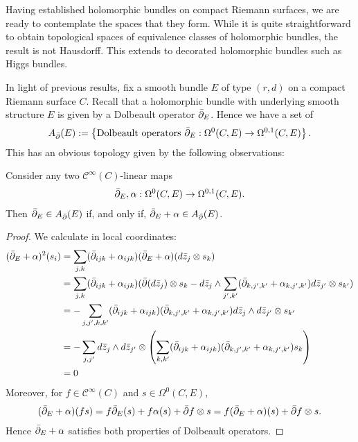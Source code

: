 \documentclass[12pt]{ociamthesis}  %
\begin{document}
Having established holomorphic bundles on compact Riemann surfaces,
we are ready to contemplate the spaces that they form. While it is
quite straightforward to obtain topological spaces of equivalence
classes of holomorphic bundles, the result is not Hausdorff.
This extends to decorated holomorphic bundles such as Higgs bundles.

In light of previous results, fix a smooth bundle $E$ of type $(r,d)$
on a compact Riemann surface $C$.
Recall that a holomorphic bundle with underlying smooth structure $E$
is given by a Dolbeault operator ${\bar{\partial}}_E$. Hence we have a set of
\begin{align*}
  A_{\bar{\partial}} (E) := \left\lbrace{
    \text{Dolbeault operators ${\bar{\partial}}_E : \Omega^0(C,E) \to \Omega^{0,1}(C,E)$}
  }\right\rbrace.
\end{align*}
This has an obvious topology given by the following observations:
\begin{lemma}\label{lem:affine_space_of_dolbeault_operators}
  Consider any two $\mathscr C^\infty(C)$-linear maps
  \begin{align*}
    {\bar{\partial}}_E,\alpha : \Omega^0(C,E) \to \Omega^{0,1}(C,E).
  \end{align*}
  Then ${\bar{\partial}}_E\in A_{\bar{\partial}} (E)$ if, and only if, ${\bar{\partial}}_E+\alpha\in A_{\bar{\partial}} (E)$.
  \begin{proof}
    We calculate in local coordinates:
    \begin{align*}
      ({\bar{\partial}}_E + \alpha)^2(s_i)
       & = \sum_{j,k} ({\bar{\partial}}_{ijk} + \alpha_{ijk})({\bar{\partial}}_E + \alpha)( d\bar z_j\otimes s_k)                                                                                     \\
       & = \sum_{j,k} ({\bar{\partial}}_{ijk} + \alpha_{ijk})({\bar{\partial}}(d\bar z_j) \otimes s_k -  d\bar z_j \wedge \sum_{j',k'}({\bar{\partial}}_{k,j',k'} + \alpha_{k,j',k'}) d\bar z_{j'}\otimes s_{k'}) \\
       & = - \sum_{j,j',k,k'} ({\bar{\partial}}_{ijk} + \alpha_{ijk})({\bar{\partial}}_{k,j',k'} + \alpha_{k,j',k'}) d\bar z_j \wedge d\bar z_{j'}\otimes s_{k'}                                      \\
       & = - \sum_{j,j'}
      d\bar z_j \wedge d\bar z_{j'}\otimes \left(
      \sum_{k,k'} ({\bar{\partial}}_{ijk} + \alpha_{ijk})({\bar{\partial}}_{k,j',k'} + \alpha_{k,j',k'}) s_{k}\right)                                                                                 \\
       & = 0
    \end{align*}
    Moreover, for $f\in \mathscr C^\infty(C)$ and $s\in\Omega^0(C,E)$,
    \begin{align*}
      ({\bar{\partial}}_E + \alpha)(fs) = f{\bar{\partial}}_E(s) + f\alpha(s) + {\bar{\partial}} f \otimes s
      = f({\bar{\partial}}_E+\alpha)(s) + {\bar{\partial}} f \otimes s.
    \end{align*}
    Hence ${\bar{\partial}}_E + \alpha$ satisfies both properties of Dolbeault
    operators.
  \end{proof}
\end{lemma}
\end{document}
